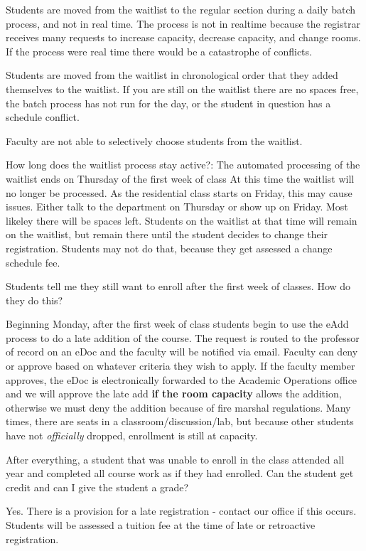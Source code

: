 Students are moved from the waitlist to the regular section during a
daily batch process, and not in real time. The process is not in
realtime because the registrar receives many requests to increase
capacity, decrease capacity, and change rooms. If the process were real
time there would be a catastrophe of conflicts.

Students are moved from the waitlist in chronological order that they
added themselves to the waitlist. If you are still on the waitlist there
are no spaces free, the batch process has not run for the day, or the
student in question has a schedule conflict.

Faculty are not able to selectively choose students from the waitlist.

How long does the waitlist process stay active?: The automated
processing of the waitlist ends on Thursday of the first week of class
At this time the waitlist will no longer be processed. 
As the residential class starts on Friday, this may cause
issues. Either talk to the department on Thursday or show up on
Friday. Most likeley there will be spaces left. 
Students on the waitlist at that time will remain on the waitlist, but remain there
until the student decides to change their registration. Students may not
do that, because they get assessed a change schedule fee.

Students tell me they still want to enroll after the first week of
classes. How do they do this?

Beginning Monday, after the first week of class students begin to use
the eAdd process to do a late addition of the course. The request is
routed to the professor of record on an eDoc and the faculty will be
notified via email. Faculty can deny or approve based on whatever
criteria they wish to apply. If the faculty member approves, the eDoc
is electronically forwarded to the Academic Operations office and we
will approve the late add \textbf{if the room capacity} allows the
addition, otherwise we must deny the addition because of fire marshal
regulations. Many times, there are seats in a
classroom/discussion/lab, but because other students have not
\emph{officially} dropped, enrollment is still at capacity.

After everything, a student that was unable to enroll in the class
attended all year and completed all course work as if they had enrolled.
Can the student get credit and can I give the student a grade?

Yes. There is a provision for a late registration - contact our office
if this occurs. Students will be assessed a tuition fee at the time of
late or retroactive registration.

